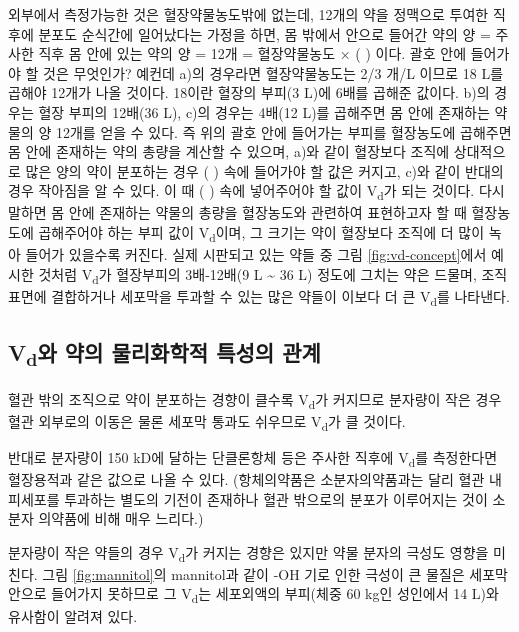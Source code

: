 \documentclass[
  11pt,
  krantz2, a4paper, twoside]{krantz}
\theoremstyle{definition}
\theoremstyle{definition}
\theoremstyle{definition}
\theoremstyle{definition}
\theoremstyle{remark}
\begin{document}
외부에서 측정가능한 것은 혈장약물농도밖에 없는데, 12개의 약을
정맥으로 투여한 직후에 분포도 순식간에 일어났다는 가정을 하면, 몸 밖에서
안으로 들어간 약의 양 = 주사한 직후 몸 안에 있는 약의 양 = 12개 =
혈장약물농도 × ( ) 이다. 괄호 안에 들어가야 할 것은 무엇인가? 예컨데
a)의 경우라면 혈장약물농도는 2/3 개/L 이므로 18 L를 곱해야 12개가 나올
것이다. 18이란 혈장의 부피(3 L)에 6배를 곱해준 값이다. b)의 경우는 혈장
부피의 12배(36 L), c)의 경우는 4배(12 L)를 곱해주면 몸 안에 존재하는
약물의 양 12개를 얻을 수 있다. 즉 위의 괄호 안에 들어가는 부피를
혈장농도에 곱해주면 몸 안에 존재하는 약의 총량을 계산할 수 있으며, a)와
같이 혈장보다 조직에 상대적으로 많은 양의 약이 분포하는 경우 ( ) 속에
들어가야 할 값은 커지고, c)와 같이 반대의 경우 작아짐을 알 수 있다. 이
때 ( ) 속에 넣어주어야 할 값이 V\textsubscript{d}가 되는 것이다. 다시 말하면 몸 안에
존재하는 약물의 총량을 혈장농도와 관련하여 표현하고자 할 때 혈장농도에
곱해주어야 하는 부피 값이 V\textsubscript{d}이며, 그 크기는 약이 혈장보다 조직에 더
많이 녹아 들어가 있을수록 커진다. 실제 시판되고 있는 약들 중 그림 \ref{fig:vd-concept}에서 예시한 것처럼 V\textsubscript{d}가 혈장부피의 3배-12배(9 L \textasciitilde{} 36 L) 정도에
그치는 약은 드물며, 조직 표면에 결합하거나 세포막을 투과할 수 있는
많은 약들이 이보다 더 큰 V\textsubscript{d}를 나타낸다.

\subsection{\texorpdfstring{V\textsubscript{d}와 약의 물리화학적 특성의 관계}{Vd와 약의 물리화학적 특성의 관계}}\label{vduxc640-uxc57duxc758-uxbb3cuxb9acuxd654uxd559uxc801-uxd2b9uxc131uxc758-uxad00uxacc4}

혈관 밖의 조직으로 약이 분포하는 경향이 클수록 V\textsubscript{d}가 커지므로 분자량이
작은 경우 혈관 외부로의 이동은 물론 세포막 통과도 쉬우므로 V\textsubscript{d}가 클
것이다.

반대로 분자량이 150 kD에 달하는 단클론항체 등은 주사한 직후에 V\textsubscript{d}를
측정한다면 혈장용적과 같은 값으로 나올 수 있다. (항체의약품은
소분자의약품과는 달리 혈관 내피세포를 투과하는 별도의 기전이 존재하나
혈관 밖으로의 분포가 이루어지는 것이 소분자 의약품에 비해 매우 느리다.)

분자량이 작은 약들의 경우 V\textsubscript{d}가 커지는 경향은 있지만 약물 분자의 극성도
영향을 미친다. 그림 \ref{fig:mannitol}의 mannitol과 같이 -OH 기로 인한 극성이 큰 물질은 
세포막 안으로 들어가지 못하므로 그 V\textsubscript{d}는 세포외액의 부피(체중 60 kg인
성인에서 14 L)와 유사함이 알려져 있다.
\end{document}
